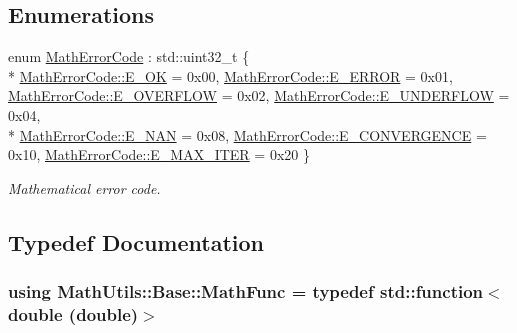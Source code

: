 \subsection*{Enumerations}
\begin{DoxyCompactItemize}
\item 
enum \hyperlink{namespaceMathUtils_1_1Base_aac4088d82202217a0cea2b81ec0649a2}{Math\-Error\-Code} \-: std\-::uint32\-\_\-t \{ \\*
\hyperlink{namespaceMathUtils_1_1Base_aac4088d82202217a0cea2b81ec0649a2aa02beabe6f35d74f47eb01520970b350}{Math\-Error\-Code\-::\-E\-\_\-\-O\-K} = 0x00, 
\hyperlink{namespaceMathUtils_1_1Base_aac4088d82202217a0cea2b81ec0649a2a80e070750e5ff70ab6a0e04cf55b8d76}{Math\-Error\-Code\-::\-E\-\_\-\-E\-R\-R\-O\-R} = 0x01, 
\hyperlink{namespaceMathUtils_1_1Base_aac4088d82202217a0cea2b81ec0649a2af60e76e9f5ffc969b1946811a7397b46}{Math\-Error\-Code\-::\-E\-\_\-\-O\-V\-E\-R\-F\-L\-O\-W} = 0x02, 
\hyperlink{namespaceMathUtils_1_1Base_aac4088d82202217a0cea2b81ec0649a2afa96178e08af17a4ee3edebaec32d1af}{Math\-Error\-Code\-::\-E\-\_\-\-U\-N\-D\-E\-R\-F\-L\-O\-W} = 0x04, 
\\*
\hyperlink{namespaceMathUtils_1_1Base_aac4088d82202217a0cea2b81ec0649a2ae57d4e2d3045c76993a1130ccf754924}{Math\-Error\-Code\-::\-E\-\_\-\-N\-A\-N} = 0x08, 
\hyperlink{namespaceMathUtils_1_1Base_aac4088d82202217a0cea2b81ec0649a2a804ef965d3982007bc8b7c61813179c8}{Math\-Error\-Code\-::\-E\-\_\-\-C\-O\-N\-V\-E\-R\-G\-E\-N\-C\-E} = 0x10, 
\hyperlink{namespaceMathUtils_1_1Base_aac4088d82202217a0cea2b81ec0649a2af5d012c621ef34c94de8c173e861afcc}{Math\-Error\-Code\-::\-E\-\_\-\-M\-A\-X\-\_\-\-I\-T\-E\-R} = 0x20
 \}
\begin{DoxyCompactList}\small\item\em Mathematical error code. \end{DoxyCompactList}\end{DoxyCompactItemize}


\subsection{Typedef Documentation}
\hypertarget{namespaceMathUtils_1_1Base_a655889e83691f7f82ec161684afa2c1f}{
\subsubsection[{Math\-Func}]{\setlength{\rightskip}{0pt plus 5cm}using {\bf Math\-Utils\-::\-Base\-::\-Math\-Func} = typedef std\-::function$<$double (double)$>$}}\label{namespaceMathUtils_1_1Base_a655889e83691f7f82ec161684afa2c1f}


